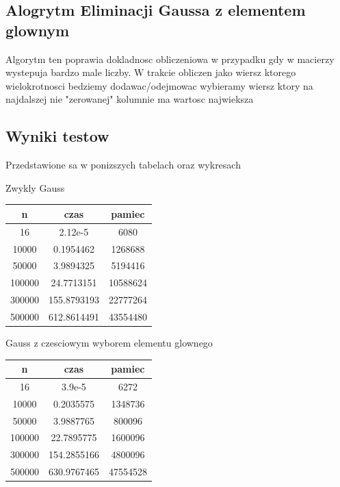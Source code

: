\documentclass{article}
\begin{document}
    \subsection{Alogrytm Eliminacji Gaussa z elementem glownym}
        Algorytm ten poprawia dokladnosc obliczeniowa w przypadku gdy w macierzy wystepuja bardzo male liczby. W trakcie obliczen jako wiersz ktorego wielokrotnosci bedziemy dodawac/odejmowac wybieramy wiersz ktory na najdalszej nie "zerowanej" kolumnie ma wartosc najwieksza

    \subsection{Wyniki testow}
        Przedstawione sa w ponizszych tabelach oraz wykresach
        
        \vspace{0.2cm}
        
        Zwykly Gauss \\
        \begin{tabular}{c|c|c}
            \hline
            n & czas & pamiec \\
            \hline
            16 & 2.12e-5 & 6080 \\
            \hline
            10000 & 0.1954462 & 1268688 \\
            \hline
            50000 & 3.9894325 & 5194416 \\
            \hline
            100000 & 24.7713151 & 10588624 \\
            \hline
            300000 & 155.8793193 & 22777264 \\
            \hline
            500000 & 612.8614491 & 43554480 \\
            \hline
        \end{tabular}
        \vspace{0.2cm}
        
        Gauss z czesciowym wyborem elementu glownego \\
        \begin{tabular}{c|c|c}
            \hline
            n & czas & pamiec \\
            \hline
            16 & 3.9e-5 & 6272 \\
            \hline
            10000 & 0.2035575 & 1348736 \\
            \hline
            50000 & 3.9887765 & 800096 \\
            \hline
            100000 & 22.7895775 & 1600096 \\
            \hline
            300000 & 154.2855166 & 4800096 \\
            \hline
            500000 & 630.9767465 & 47554528 \\
            \hline
        \end{tabular}
\end{document}
